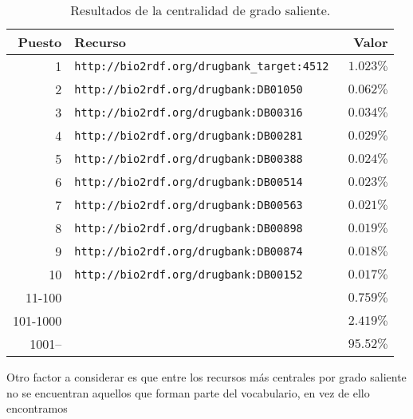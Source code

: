 \begin{table}[ht]
  \centering
  \begin{tabular}{|r|l|r|}\hline
    \bf{Puesto} & \bf{Recurso} & \bf{Valor} \\\hline
     1 & \tt{http://bio2rdf.org/drugbank\_target:4512} & $1.023\%$ \\\hline
     2 & \tt{http://bio2rdf.org/drugbank:DB01050}      & $0.062\%$ \\\hline
     3 & \tt{http://bio2rdf.org/drugbank:DB00316}      & $0.034\%$ \\\hline
     4 & \tt{http://bio2rdf.org/drugbank:DB00281}      & $0.029\%$ \\\hline
     5 & \tt{http://bio2rdf.org/drugbank:DB00388}      & $0.024\%$ \\\hline
     6 & \tt{http://bio2rdf.org/drugbank:DB00514}      & $0.023\%$ \\\hline
     7 & \tt{http://bio2rdf.org/drugbank:DB00563}      & $0.021\%$ \\\hline
     8 & \tt{http://bio2rdf.org/drugbank:DB00898}      & $0.019\%$ \\\hline
     9 & \tt{http://bio2rdf.org/drugbank:DB00874}      & $0.018\%$ \\\hline
    10 & \tt{http://bio2rdf.org/drugbank:DB00152}      & $0.017\%$ \\\hline
    11-100 		& & $0.759\%$ \\\hline
    101-1000  & & $2.419\%$ \\\hline
    1001--    & & $95.52\%$ \\\hline
  \end{tabular}
  \caption{Resultados de la centralidad de grado saliente.}\label{tab:odcres}
\end{table}

Otro factor a considerar es que entre los recursos más centrales por grado
saliente no se encuentran aquellos que forman parte del vocabulario, en vez de
ello encontramos %


